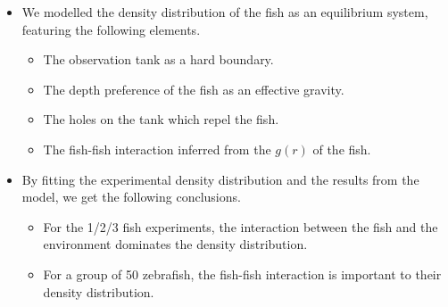 \documentclass[11pt,twoside]{report}
\begin{document}
\vfill
\pagebreak

\begin{adjustwidth}{0cm}{-5cm}
\begin{tcolorbox}[
title=Summary of Chapter~6,
fonttitle=\sffamily\Large,
right=0.1\linewidth,
enlarge bottom by=0.5em,
enlarge top by=0.5em,
]
\begin{itemize}
	\item We modelled the density distribution of the fish as an equilibrium system, featuring the following elements.

	\begin{itemize}
		\item The observation tank as a hard boundary.
		\item The depth preference of the fish as an effective gravity.
		\item The holes on the tank which repel the fish.
		\item The fish-fish interaction inferred from the $g(r)$ of the fish.
	\end{itemize}

	\item By fitting the experimental density distribution and the results from the model, we get the following conclusions.
	\begin{itemize}
		\item For the 1/2/3 fish experiments, the interaction between the fish and the environment dominates the density distribution.
		\item For a group of 50 zebrafish, the fish-fish interaction is important to their density distribution.
	\end{itemize}
	

\end{itemize}
\end{tcolorbox}
\end{adjustwidth}
\end{document}
